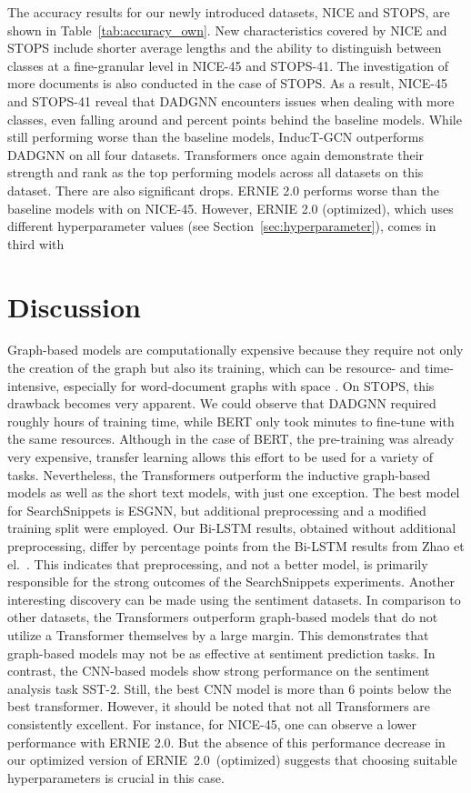 \documentclass[runningheads]{llncs}
\begin{document}
The accuracy results for our newly introduced datasets, NICE and STOPS, are shown in Table~\ref{tab:accuracy_own}.
New characteristics covered by NICE and STOPS include shorter average lengths and the ability to distinguish between classes at a fine-granular level in NICE-45 and STOPS-41.
The investigation of more documents is also conducted in the case of STOPS.
As a result, NICE-45 and STOPS-41 reveal that DADGNN encounters issues when dealing with more classes, even  falling around  and  percent points behind the baseline models.
While still performing worse than the baseline models, InducT-GCN outperforms DADGNN on all four datasets.
Transformers once again demonstrate their strength and rank as the top performing models across all datasets on this dataset. There are also significant drops. ERNIE 2.0 performs worse than the baseline models with  on NICE-45. 
However, ERNIE 2.0 (optimized), which uses different hyperparameter values (see Section~\ref{sec:hyperparameter}), comes in third with 

\section{Discussion}
\label{sec:discussion}

Graph-based models are computationally expensive because they require not only the creation of the graph but also its training, which can be resource- and time-intensive, especially for word-document graphs with  space \cite{galkeMLP}.
On STOPS, this drawback becomes very apparent. We could observe that DADGNN required roughly  hours of training time, while BERT only took  minutes to fine-tune with the same resources.
Although in the case of BERT, the pre-training was already very expensive, transfer learning allows this effort to be used for a variety of tasks.
Nevertheless, the Transformers outperform the inductive graph-based models as well as the short text models, with just one exception.
The best model for SearchSnippets is ESGNN, but additional preprocessing and a modified training split were employed.
Our Bi-LSTM results, obtained without additional preprocessing, differ by  percentage points from the Bi-LSTM results from Zhao et el.~\cite{zhao2021sequential}. 
This indicates that preprocessing, and not a better model, is primarily responsible for the strong outcomes of the SearchSnippets experiments.
Another interesting discovery can be made using the sentiment datasets. In comparison to other datasets, the Transformers outperform graph-based models that do not utilize a Transformer themselves by a large margin. This demonstrates that graph-based models may not be as effective at sentiment prediction tasks.
In contrast, the CNN-based models show strong performance on the sentiment analysis task SST-2.
Still, the best CNN model is more than 6 points below the best transformer.
However, it should be noted that not all Transformers are consistently excellent.
For instance, for NICE-45, one can observe a lower performance with ERNIE 2.0. 
But the absence of this performance decrease in our optimized version of ERNIE~2.0~(optimized) suggests that choosing suitable hyperparameters is crucial in this case.
\end{document}
